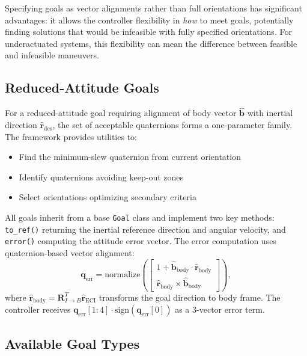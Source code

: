 \documentclass[conference]{IEEEtran}
\begin{document}
Specifying goals as vector alignments rather than full orientations has significant advantages: it allows the controller flexibility in \emph{how} to meet goals, potentially finding solutions that would be infeasible with fully specified orientations. For underactuated systems, this flexibility can mean the difference between feasible and infeasible maneuvers.

\subsection{Reduced-Attitude Goals}\label{subsec:reduced_goals}

For a reduced-attitude goal requiring alignment of body vector $\hat{\mathbf{b}}$ with inertial direction $\hat{\mathbf{r}}_{\text{des}}$, the set of acceptable quaternions forms a one-parameter family. The framework provides utilities to:
\begin{itemize}
    \item Find the minimum-slew quaternion from current orientation
    \item Identify quaternions avoiding keep-out zones
    \item Select orientations optimizing secondary criteria
\end{itemize}

All goals inherit from a base \texttt{Goal} class and implement two key methods: \texttt{to\_ref()} returning the inertial reference direction and angular velocity, and \texttt{error()} computing the attitude error vector. The error computation uses quaternion-based vector alignment:
\begin{equation}
\mathbf{q}_{\text{err}} = \text{normalize}\left(\begin{bmatrix} 1 + \hat{\mathbf{b}}_{\text{body}} \cdot \hat{\mathbf{r}}_{\text{body}} \\ \hat{\mathbf{r}}_{\text{body}} \times \hat{\mathbf{b}}_{\text{body}} \end{bmatrix}\right),
\end{equation}
where $\hat{\mathbf{r}}_{\text{body}} = \mathbf{R}_{I \to B}^T \hat{\mathbf{r}}_{\text{ECI}}$ transforms the goal direction to body frame. The controller receives $\mathbf{q}_{\text{err}}[1{:}4] \cdot \text{sign}(\mathbf{q}_{\text{err}}[0])$ as a 3-vector error term.

\subsection{Available Goal Types}\label{subsec:goal_types_impl}
\end{document}
